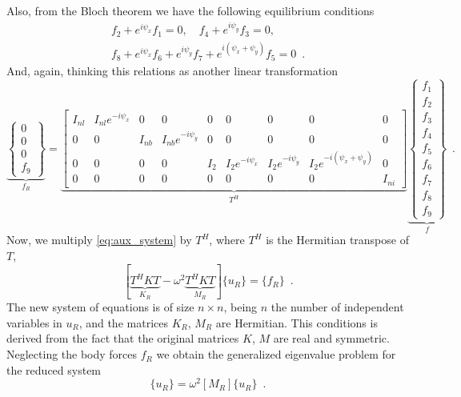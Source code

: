 Also, from the Bloch theorem we have the following equilibrium conditions
\begin{align*}
f_2 + e^{i \psi_x}f_1=0, \quad f_4 + e^{i \psi_y}f_3=0 , \\
f_8 + e^{i \psi_x}f_6 + e^{i \psi_y}f_7 +e^{i (\psi_x + \psi_y)}f_5 = 0 \enspace .
\end{align*}
And, again, thinking this relations as another linear transformation
\begin{equation}
\underbrace{\left\lbrace  \begin{array}{c}
0 \\ 
0 \\ 
0 \\ 
f_9 
\end{array}  \right\rbrace }_{f_R} = 
\underbrace{\left[ \begin{array}{ccccccccc}
I_{nl} & I_{nl} e^{-i\psi_x} & 0 & 0 & 0 & 0 & 0 & 0 & 0 \\ 
0 & 0 & I_{nb} & I_{nb} e^{-i\psi_y} & 0 & 0 & 0 & 0 & 0 \\ 
0 & 0 & 0 & 0 & I_{2} & I_{2} e^{-i\psi_x} & I_{2} e^{-i\psi_y} & I_{2} e^{-i(\psi_x+\psi_y)} & 0 \\ 
0 & 0 & 0 & 0 & 0 & 0 & 0 & 0 & I_{ni} 
\end{array}  \right] }_{T^H}
\underbrace{\left\lbrace \begin{array}{c}
f_1 \\ 
f_2 \\ 
f_3 \\ 
f_4 \\ 
f_5 \\ 
f_6 \\ 
f_7 \\ 
f_8 \\ 
f_9
\end{array} 
\right\rbrace }_{f} \enspace .
\label{eq:force_transformation}
\end{equation}
Now, we multiply \eqref{eq:aux_system} by $T^H$, where $T^H$ is the Hermitian transpose of $T$,
\begin{equation}
\left[\underbrace{T^HKT}_{K_R} - \omega^2\underbrace{T^HKT}_{M_R} \right] \lbrace u_R\rbrace = \lbrace f_R\rbrace \enspace .
\label{eq:transfo_bloch}
\end{equation}
The new system of equations is of size $n\times n$, being $n$ the number of independent variables in  $u_R$, and the matrices  $K_R$, $M_R$ are Hermitian. This conditions is derived from the fact that the original matrices $K$, $M$ are real and symmetric. Neglecting the body forces $f_R$ we obtain the generalized eigenvalue problem for the reduced system
\begin{equation}
[K_R]\lbrace u_R\rbrace = \omega^2 [M_R] \lbrace u_R\rbrace \enspace .
\end{equation}


